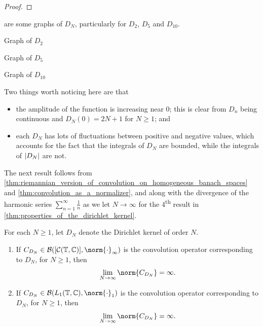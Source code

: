 \documentclass[notoc,notitlepage]{tufte-book}
\begin{document}
\begin{proof}
\end{proof}

 are some graphs of $D_N$,
particularly for $D_2$, $D_5$ and $D_{10}$.
\begin{marginfigure}
  \centering
  
  \caption{Graph of $D_2$}\label{fig:graph_of_d_2_}
  
  \caption{Graph of $D_5$}\label{fig:graph_of_d_5_}
  
  \caption{Graph of $D_{10}$}\label{fig:graph_of_d_10_}
\end{marginfigure}
Two things worth noticing here are that
\begin{itemize}
  \item the amplitude of the function is increasing near $0$;
    this is clear from $D_n$ being continuous and $D_N(0) = 2N + 1$
    for $N \geq 1$; and
  \item each $D_N$ has lots of fluctuations between positive and negative
    values, which accounts for the fact that the integrals of $D_N$
    are bounded, while the integrals of $\left|D_N\right|$ are not.
\end{itemize}

The next result follows from
\cref{thm:riemannian_version_of_convolution_on_homogeneous_banach_spaces}
and
\cref{thm:convolution_as_a_normalizer}, and
along with the divergence of the harmonic series $\sum_{n=1}^{\infty} \frac{1}{n}$
as we let $N \to \infty$ for the 4\textsuperscript{th} result in
\cref{thm:properties_of_the_dirichlet_kernel}.

\begin{crly}\label{crly:unboundedness_of_convolution_operators_for_the_dirichlet_kernel}
  For each $N \geq 1$, let $D_N$ denote the Dirichlet kernel of order $N$.
  \begin{enumerate}
    \item If $C_{D_N} \in \mathcal{B}([\mathcal{C}(\mathbb{T}, \mathbb{C})],
      \norm{\cdot}_{\infty})$ is the convolution operator
      corresponding to $D_N$, for $N \geq 1$, then
      \begin{equation*}
        \lim_{N \to \infty} \norm{C_{D_N}} = \infty.
      \end{equation*}
    \item If $C_{D_N} \in \mathcal{B}(L_1(\mathbb{T}, \mathbb{C}), \norm{\cdot}_1)$
      is the convolution operator corresponding to $D_N$, for $N \geq 1$, then
      \begin{equation*}
        \lim_{N \to \infty} \norm{C_{D_N}} = \infty.
      \end{equation*}
  \end{enumerate}
\end{crly}
\end{document}
